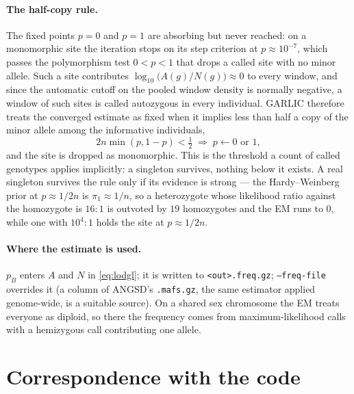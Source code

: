 \documentclass[11pt]{article}
\newcommand{\code}[1]{\texttt{#1}}
\begin{document}
\paragraph{The half-copy rule.} The fixed points $p = 0$ and $p = 1$ are absorbing but never reached: on a monomorphic site the iteration stops on its step criterion at $p \approx 10^{-7}$, which passes the polymorphism test $0 < p < 1$ that drops a called site with no minor allele. Such a site contributes $\log_{10}\big(A(g)/N(g)\big) \approx 0$ to every window, and since the automatic cutoff on the pooled window density is normally negative, a window of such sites is called autozygous in every individual. GARLIC therefore treats the converged estimate as fixed when it implies less than half a copy of the minor allele among the informative individuals,
\begin{equation}
2n \min(p, 1-p) < \tfrac12 \;\Longrightarrow\; p \leftarrow 0 \text{ or } 1 ,
\end{equation}
and the site is dropped as monomorphic. This is the threshold a count of called genotypes applies implicitly: a singleton survives, nothing below it exists. A real singleton survives the rule only if its evidence is strong --- the Hardy--Weinberg prior at $p \approx 1/2n$ is $\pi_1 \approx 1/n$, so a heterozygote whose likelihood ratio against the homozygote is $16{:}1$ is outvoted by $19$ homozygotes and the EM runs to $0$, while one with $10^4{:}1$ holds the site at $p \approx 1/2n$.

\paragraph{Where the estimate is used.} $p_B$ enters $A$ and $N$ in \eqref{eq:lodgl}; it is written to \code{<out>.freq.gz}; \code{--freq-file} overrides it (a column of ANGSD's \code{.mafs.gz}, the same estimator applied genome-wide, is a suitable source). On a shared sex chromosome the EM treats everyone as diploid, so there the frequency comes from maximum-likelihood calls with a hemizygous call contributing one allele.

\section{Correspondence with the code}
\label{sec:code}
\end{document}
